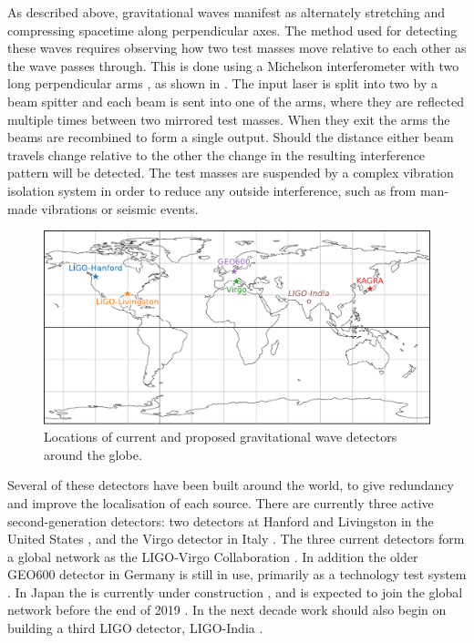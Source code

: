 \begin{colsection}
\begin{colsection}
As described above, gravitational waves manifest as alternately stretching and compressing spacetime along perpendicular axes. The method used for detecting these waves requires observing how two test masses move relative to each other as the wave passes through. This is done using a Michelson interferometer with two long perpendicular arms \citep{BIGbirmingham}, as shown in . The input laser is split into two by a beam spitter and each beam is sent into one of the arms, where they are reflected multiple times between two mirrored test masses. When they exit the arms the beams are recombined to form a single output. Should the distance either beam travels change relative to the other the change in the resulting interference pattern will be detected. The test masses are suspended by a complex vibration isolation system in order to reduce any outside interference, such as from man-made vibrations or seismic events.

\newpage

\begin{figure}[t]
    \begin{center}
        \includegraphics[width=0.95\linewidth]{images/global.pdf}
    \end{center}
    \caption[Locations of gravitational wave detectors]{
        Locations of current and proposed gravitational wave detectors around the globe.
        }\label{fig:global}
\end{figure}

Several of these detectors have been built around the world, to give redundancy and improve the localisation of each source. There are currently three active second-generation detectors: two  detectors at Hanford and Livingston in the United States \citep{LIGO}, and the  Virgo detector in Italy \citep{Virgo}. The three current detectors form a global network as the LIGO-Virgo Collaboration  \citep[LVC,][]{LIGO-Virgo}. In addition the older GEO600 detector in Germany is still in use, primarily as a technology test system \citep{GEO600}. In Japan the  is currently under construction \citep{KAGRA}, and is expected to join the global network before the end of 2019 \citep{LIGO-Virgo-KAGRA}. In the next decade work should also begin on building a third LIGO detector, LIGO-India \citep{LIGO_India}.


\end{colsection}
\end{colsection}

